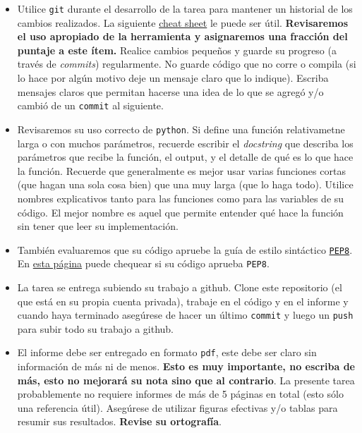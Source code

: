 \documentclass[letter, 11pt]{article}
\begin{document}
\vspace{1em}
\begin{itemize}

  \item Utilice \texttt{git} durante el desarrollo de la tarea para mantener un
    historial de los cambios realizados. La siguiente
    \href{https://education.github.com/git-cheat-sheet-education.pdf}{cheat
      sheet} le puede ser útil. \textbf{Revisaremos el uso apropiado
    de la herramienta y asignaremos una fracción del puntaje a este ítem.}
    Realice cambios pequeños y guarde su progreso (a través de \emph{commits})
    regularmente. No guarde código que no corre o compila (si lo hace por algún
    motivo deje un mensaje claro que lo indique). Escriba mensajes claros que
    permitan hacerse una idea de lo que se agregó y/o cambió de un
    \texttt{commit} al siguiente.

  \item Revisaremos su uso correcto de \texttt{python}. Si define una función
    relativametne larga o con muchos parámetros, recuerde escribir el
    \emph{docstring} que describa los parámetros que recibe la función, el
    output, y el detalle de qué es lo que hace la función. Recuerde que
    generalmente es mejor usar varias funciones cortas (que hagan una sola cosa
    bien) que una muy larga (que lo haga todo).  Utilice nombres explicativos
    tanto para las funciones como para las variables de su código.  El mejor
    nombre es aquel que permite entender qué hace la función sin tener que leer
    su implementación.

  \item También evaluaremos que su código apruebe la guía de estilo sintáctico
    \href{https://www.python.org/dev/peps/pep-0008/}{\texttt{PEP8}}. En
    \href{http://pep8online.com}{esta página} puede chequear si su código
    aprueba \texttt{PEP8}.

  \item La tarea se entrega subiendo su trabajo a github. Clone este
    repositorio (el que está en su propia cuenta privada), trabaje en el código
    y en el informe y cuando haya terminado asegúrese de hacer un último
    \texttt{commit} y luego un \texttt{push} para subir todo su trabajo a
    github.

  \item El informe debe ser entregado en formato \texttt{pdf}, este debe ser
    claro sin información de más ni de menos. \textbf{Esto es muy importante,
    no escriba de más, esto no mejorará su nota sino que al contrario}. La
    presente tarea probablemente no requiere informes de más de 5 páginas en
    total (esto sólo una referencia útil).  Asegúrese de utilizar figuras
    efectivas y/o tablas para resumir sus resultados. \textbf{Revise su
    ortografía}.


\end{itemize}
\end{document}
